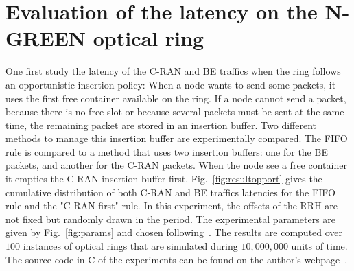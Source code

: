 \documentclass[]{algotel}
\begin{document}
   \section{Evaluation of the latency on the N-GREEN optical ring}
   \label{sec:oportmethods}
   
   
  One first study the latency of the C-RAN and BE traffics when the ring follows an opportunistic insertion policy: When a node wants to send some packets, it uses the first free container available on the ring. 
  If a node cannot send a packet, because there is no free slot or because several packets must be sent at the same time, the remaining packet are stored in an insertion buffer. Two different methods to manage this insertion buffer are experimentally compared. The FIFO rule is compared to a method that uses two insertion buffers: one for the BE packets, and another for the C-RAN packets. When the node see a free container it empties the C-RAN insertion buffer first.  Fig.~\ref{fig:resultopport} gives the cumulative distribution of both C-RAN and BE traffics latencies for the FIFO rule and the "C-RAN first" rule. In this experiment, the offsets of the RRH are not fixed but randomly drawn in the period. The experimental parameters are given by Fig.~\ref{fig:params} and chosen following~\cite{ngreenarchitecture}. The results are computed over $100$ instances of optical rings that are simulated during $10,000,000$ units of time. The source code in C of the experiments can be found on the author's webpage~\cite{webpage}.
  
\end{document}
